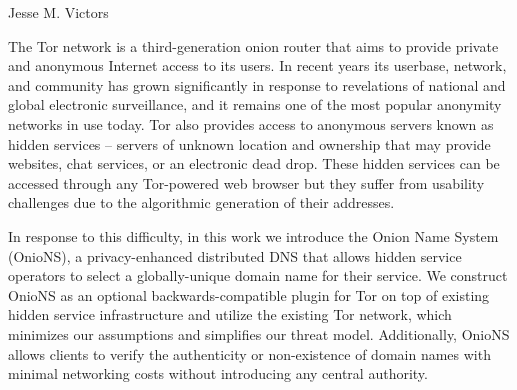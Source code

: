 \begin{publicabstract}
\centerline{Jesse M. Victors}
\vspace{12pt}

The Tor network is a third-generation onion router that aims to provide private and anonymous Internet access to its users. In recent years its userbase, network, and community has grown significantly in response to revelations of national and global electronic surveillance, and it remains one of the most popular anonymity networks in use today. Tor also provides access to anonymous servers known as hidden services -- servers of unknown location and ownership that may provide websites, chat services, or an electronic dead drop. These hidden services can be accessed through any Tor-powered web browser but they suffer from usability challenges due to the algorithmic generation of their addresses.

In response to this difficulty, in this work we introduce the Onion Name System (OnioNS), a privacy-enhanced distributed DNS that allows hidden service operators to select a globally-unique domain name for their service. We construct OnioNS as an optional backwards-compatible plugin for Tor on top of existing hidden service infrastructure and utilize the existing Tor network, which minimizes our assumptions and simplifies our threat model. Additionally, OnioNS allows clients to verify the authenticity or non-existence of domain names with minimal networking costs without introducing any central authority.

\end{publicabstract}
